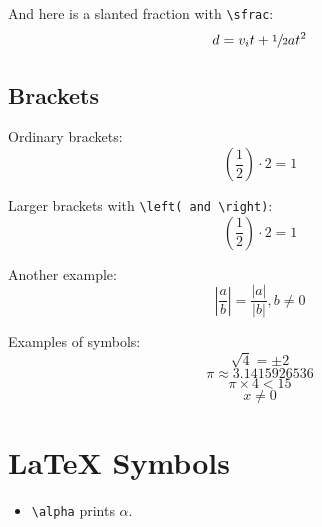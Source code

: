 \documentclass{article}
\begin{document}
And here is a slanted fraction with \texttt{\textbackslash sfrac}:
$$d = v_i t + \sfrac{1}{2} a t^2$$

\subsection{Brackets}
Ordinary brackets:
$$(\frac{1}{2}) \cdot 2 = 1$$

Larger brackets with \texttt{\textbackslash left( and \textbackslash right)}:
$$\left( \frac{1}{2} \right) \cdot 2 = 1$$

Another example:
$$\left| \frac{a}{b} \right| = \frac{|a|}{|b|}, b \neq 0$$

Examples of symbols:
$$\sqrt{4} = \pm 2$$
$$\pi \approx 3.1415926536$$
$$\pi \times 4 < 15$$
$$x \neq 0$$

\cleardoublepage

\section{LaTeX Symbols}
\begin{itemize}
    \item \texttt{\textbackslash alpha} prints $\alpha$.
\end{itemize}
\end{document}
